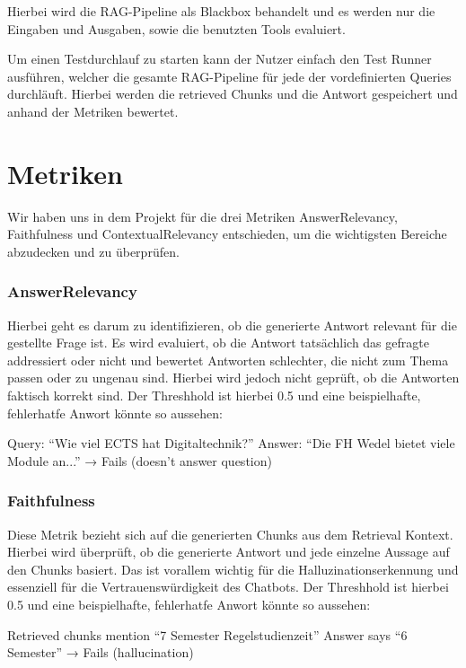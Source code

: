 Hierbei wird die RAG-Pipeline als Blackbox behandelt und es werden nur die Eingaben und Ausgaben, sowie die benutzten Tools evaluiert.

Um einen Testdurchlauf zu starten kann der Nutzer einfach den Test Runner ausführen, welcher die gesamte RAG-Pipeline für jede der vordefinierten Queries durchläuft. Hierbei werden die retrieved Chunks und die Antwort gespeichert und anhand der Metriken bewertet.


\section{Metriken}
Wir haben uns in dem Projekt für die drei Metriken AnswerRelevancy, Faithfulness und ContextualRelevancy entschieden, um die wichtigsten Bereiche abzudecken und zu überprüfen.

\subsubsection{AnswerRelevancy}
Hierbei geht es darum zu identifizieren, ob die generierte Antwort relevant für die gestellte Frage ist. Es wird evaluiert, ob die Antwort tatsächlich das gefragte addressiert oder nicht und bewertet Antworten schlechter, die nicht zum Thema passen oder zu ungenau sind. Hierbei wird jedoch nicht geprüft, ob die Antworten faktisch korrekt sind. Der Threshhold ist hierbei 0.5 und eine beispielhafte, fehlerhatfe Anwort könnte so aussehen:

Query: \enquote{Wie viel ECTS hat Digitaltechnik?}\newline
Answer: \enquote{Die FH Wedel bietet viele Module an...} → Fails (doesn't answer question)

\subsubsection{Faithfulness}
Diese Metrik bezieht sich auf die generierten Chunks aus dem Retrieval Kontext. Hierbei wird überprüft, ob die generierte Antwort und jede einzelne Aussage auf den Chunks basiert. Das ist vorallem wichtig für die Halluzinationserkennung und essenziell für die Vertrauenswürdigkeit des Chatbots. Der Threshhold ist hierbei 0.5 und eine beispielhafte, fehlerhatfe Anwort könnte so aussehen:

Retrieved chunks mention \enquote{7 Semester Regelstudienzeit}\newline
Answer says \enquote{6 Semester} → Fails (hallucination)

